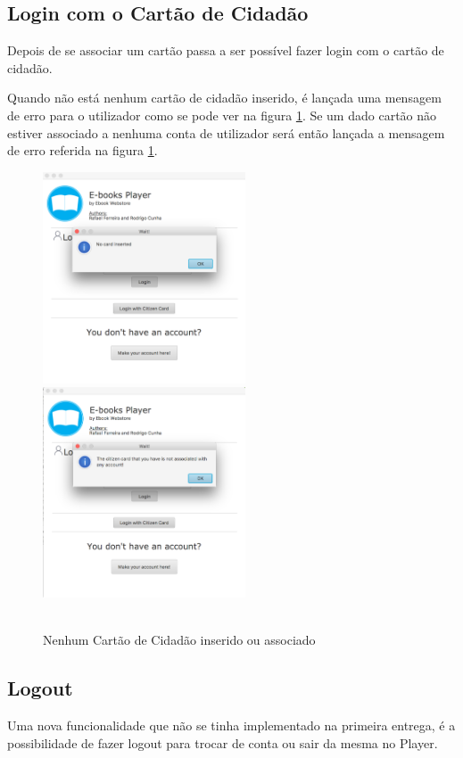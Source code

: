 \documentclass[pdftex,12pt,a4paper]{report}
\begin{document}
\newpage
\subsection{Login com o Cartão de Cidadão}

Depois de se associar um cartão passa a ser possível fazer login com o cartão de cidadão. 

Quando não está nenhum cartão de cidadão inserido, é lançada uma mensagem de erro para o utilizador como se pode ver na figura \ref{fig:nocard}. Se um dado cartão não estiver associado a nenhuma conta de utilizador será então lançada a mensagem de erro referida na figura \ref{fig:nocard}.

\begin{figure}[!htb]
\center
 \includegraphics[width=60mm,scale=1]{Nocard.png}
 \includegraphics[width=60mm,scale=1]{Noaccount.png}
 \caption{\\Nenhum Cartão de Cidadão inserido ou associado}
 \label{fig:nocard}
\end{figure}

\newpage
\subsection{Logout}

Uma nova funcionalidade que não se tinha implementado na primeira entrega, é a possibilidade de fazer logout para trocar de conta ou sair da mesma no Player.
\end{document}
